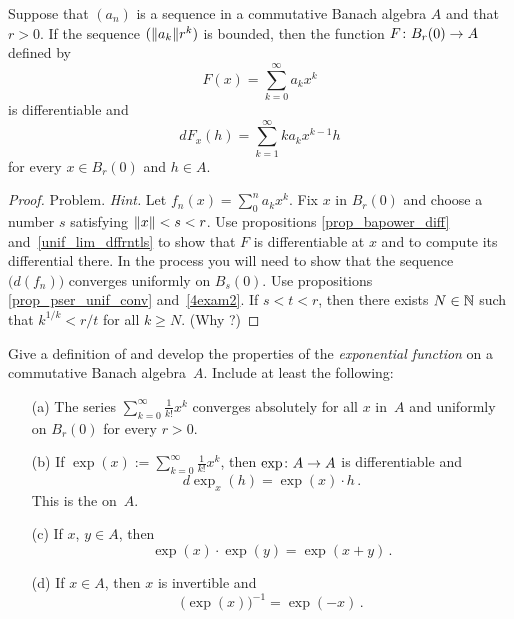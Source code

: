 \begin{thm}\label{term_by_term_diff} Suppose that
$(a_n)$ is a sequence in a commutative Banach algebra $A$ and that $r > 0$. If the sequence
$(\lVert a_k\rVert r^k)$ is bounded, then the function $F\colon B_r(0) \rightarrow A$ defined by
  \[ F(x) = \sum_{k=0}^\infty a_kx^k \]
is differentiable and
  \[ dF_x(h) = \sum_{k=1}^\infty k a_k x^{k-1}h \]
for every $x \in B_r(0)$ and $h \in A$.
\end{thm}

\begin{proof} Problem.  \emph{Hint.}  Let $f_n(x) = \sum_0^n a_kx^k$. Fix $x$ in $B_r(0)$ and
choose a number $s$ satisfying $\lVert x\rVert < s < r$. Use propositions \ref{prop_bapower_diff}
and~\ref{unif_lim_dffrntls} to show that $F$ is differentiable at $x$ and to compute its
differential there. In the process you will need to show that the sequence
$\bigl(d(f_n)\bigr)$ converges uniformly on $B_s(0)$. Use propositions
\ref{prop_pser_unif_conv} and~\ref{4exam2}.  If $s < t < r$, then there exists $N \in \mathbb{N}$ such
that $k^{1/k} < r/t$ for all $k \ge N$. (Why ?) \ns
\end{proof}

\begin{prob} Give a definition of and develop the properties of the \emph{exponential function}
on a commutative Banach algebra~$A$.  Include at least the following:
\begin{enumerate}
  \item[(a)] The series $\sum_{k=0}^\infty \frac1{k!}x^k$ converges absolutely for all $x$
in~$A$ and uniformly on $B_r(0)$ for every $r > 0$.
  \item[(b)] If $\exp(x) := \sum_{k=0}^\infty \frac1{k!}x^k$, then $\exp\colon A \rightarrow A$ is
differentiable and
    \[ d\exp_x(h) = \exp(x) \cdot h\,. \]
  This is the
 on~$A$.
  \item[(c)] If $x$, $y \in A$, then
    \[ \exp(x)\cdot\exp(y) = \exp(x + y)\,. \]
  \item[(d)] If $x \in A$, then $x$ is invertible and
    \[ \bigl(\exp(x)\bigr)^{-1} = \exp(-x)\,. \]
\end{enumerate}
\end{prob}




